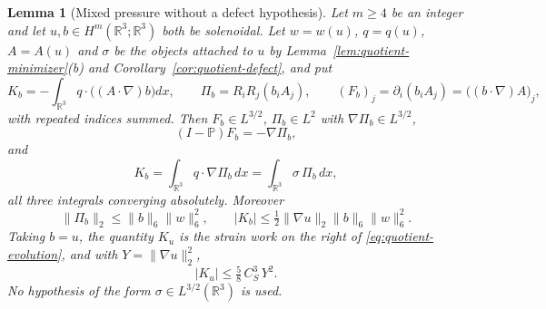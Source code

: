 \documentclass[11pt]{article}
\newtheorem{lemma}[theorem]{Lemma}
\theoremstyle{definition}
\theoremstyle{plain}
\newcommand{\R}{\mathbb R}
\newcommand{\norm}[1]{\lVert #1\rVert}
\begin{document}
\begin{lemma}[Mixed pressure without a defect hypothesis]
\label{lem:quotient-mixed-pressure}
Let $m\ge4$ be an integer and let $u,b\in H^m(\R^3;\R^3)$ both be
solenoidal.  Let $w=w(u)$, $q=q(u)$, $A=A(u)$ and $\sigma$ be the objects
attached to $u$ by Lemma~\ref{lem:quotient-minimizer}(b) and
Corollary~\ref{cor:quotient-defect}, and put
\begin{equation}\label{eq:qdc-mixeddef}
 K_b=-\int_{\R^3}q\cdot\bigl((A\cdot\nabla)b\bigr)dx,
 \qquad
 \Pi_b=R_iR_j(b_iA_j),
 \qquad
 (F_b)_j=\partial_i(b_iA_j)=\bigl((b\cdot\nabla)A\bigr)_j ,
\end{equation}
with repeated indices summed.  Then $F_b\in L^{3/2}$, $\Pi_b\in L^2$ with
$\nabla\Pi_b\in L^{3/2}$,
\begin{equation}\label{eq:qdc-rieszsign}
 (I-\mathbb P)F_b=-\nabla\Pi_b ,
\end{equation}
and
\begin{equation}\label{eq:qdc-mixedpair}
 K_b=\int_{\R^3}q\cdot\nabla\Pi_b\,dx=\int_{\R^3}\sigma\,\Pi_b\,dx ,
\end{equation}
all three integrals converging absolutely.  Moreover
\begin{equation}\label{eq:qdc-mixedbound}
 \norm{\Pi_b}_2\le\norm b_6\norm w_6^2,
 \qquad
 |K_b|\le\tfrac12\norm{\nabla u}_2\norm b_6\norm w_6^2 .
\end{equation}
Taking $b=u$, the quantity $K_u$ is the strain work on the right of
\eqref{eq:quotient-evolution}, and with $Y=\norm{\nabla u}_2^2$,
\begin{equation}\label{eq:qdc-KY}
 |K_u|\le\tfrac58\,C_S^3\,Y^2 .
\end{equation}
No hypothesis of the form $\sigma\in L^{3/2}(\R^3)$ is used.
\end{lemma}
\end{document}
